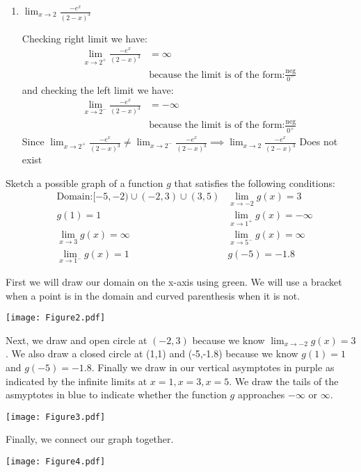 \documentclass[nooutcomes,handout]{ximera}
\begin{document}
\begin{problem}
\begin{enumerate}
    \item
      $\displaystyle \lim_{x \to 2} \frac{-e^x}{(2-x)^3}$
      \begin{freeResponse}
        Checking right limit we have:
 \begin{align*}
          \lim_{x \to 2^+} \frac{-e^x}{(2-x)^3} &= \infty\\
	&\text{because the limit is of the form:} \frac{\text{neg}}{0^-}
        \end{align*}
 	 and checking the left limit we have:
        \begin{align*}
 	\lim_{x \to 2^-} \frac{-e^x}{(2-x)^3} &= - \infty\\
	&\text{because the limit is of the form:} \frac{\text{neg}}{0^+}
	\end{align*}
	Since $ \lim_{x \to 2^+} \frac{-e^x}{(2-x)^3} \ne \lim_{x \to 2^-} \frac{-e^x}{(2-x)^3} \implies   \lim_{x \to 2} \frac{-e^x}{(2-x)^3}$ Does not exist
      \end{freeResponse}
\end{enumerate}
\end{problem}

\begin{problem}
	Sketch a possible graph of a function $g$ that satisfies the following conditions:
	\begin{align*}
	&\text{Domain:} [-5,-2) \cup (-2,3) \cup (3,5)
	& \lim_{x \to -2} g(x) = 3\\
	& g(1)=1
	& \lim_{x \to 1^+} g(x) = -\infty\\
	& \lim_{x \to 3} g(x) = \infty
	& \lim_{x \to 5^-} g(x) = \infty\\
	& \lim_{x \to 1^-} g(x) = 1
	& g(-5)=-1.8
	\end{align*}
	\begin{freeResponse}
	First we will draw our domain on the x-axis using green.  We will use a bracket when a point is in the domain and curved parenthesis when it is not.
  \begin{center}
    \texttt{[image: Figure2.pdf]}
  \end{center}
	Next, we draw and open circle at $(-2,3)$ because we know $\lim_{x \to -2} g(x) = 3$.  We also draw a closed circle at (1,1) and (-5,-1.8) because we know $g(1)=1$ and $g(-5)=-1.8$.  Finally we draw in our vertical asymptotes in purple as indicated by the infinite limits at $x=1, x=3, x=5$.  We draw the tails of the asmyptotes in blue to indicate whether the function $g$ approaches $ -\infty$ or $\infty$.
  \begin{center}
    \texttt{[image: Figure3.pdf]}
  \end{center}
	Finally, we connect our graph together.
  \begin{center}
    \texttt{[image: Figure4.pdf]}
  \end{center}
	\end{freeResponse}
\end{problem}
\end{document}
